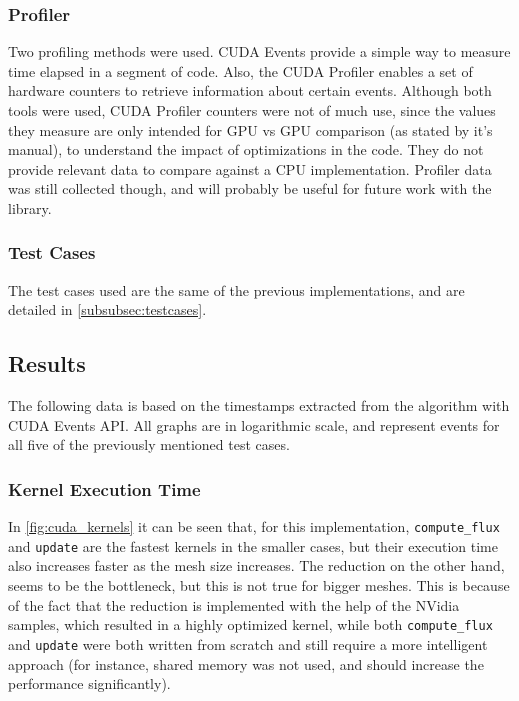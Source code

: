 \documentclass[9pt,twocolumn]{scrartcl}
\begin{document}
\subsubsection{Profiler}

Two profiling methods were used. CUDA Events provide a simple way to measure time elapsed in a segment of code. Also, the CUDA Profiler enables a set of hardware counters to retrieve information about certain events.
Although both tools were used, CUDA Profiler counters were not of much use, since the values they measure are only intended for GPU vs GPU comparison (as stated by it's manual), to understand the impact of optimizations in the code. They do not provide relevant data to compare against a CPU implementation. Profiler data was still collected though, and will probably be useful for future work with the library.

\subsubsection{Test Cases}

The test cases used are the same of the previous implementations, and are detailed in \autoref{subsubsec:testcases}.

\subsection{Results}

The following data is based on the timestamps extracted from the algorithm with CUDA Events API. All graphs are in logarithmic scale, and represent events for all five of the previously mentioned test cases.

\subsubsection{Kernel Execution Time}

In \autoref{fig:cuda_kernels} it can be seen that, for this implementation, \texttt{compute\_flux} and \texttt{update} are the fastest kernels in the smaller cases, but their execution time also increases faster as the mesh size increases. The reduction on the other hand, seems to be the bottleneck, but this is not true for bigger meshes. This is because of the fact that the reduction is implemented with the help of the NVidia samples, which resulted in a highly optimized kernel, while both \texttt{compute\_flux} and \texttt{update} were both written from scratch and still require a more intelligent approach (for instance, shared memory was not used, and should increase the performance significantly).
\end{document}

